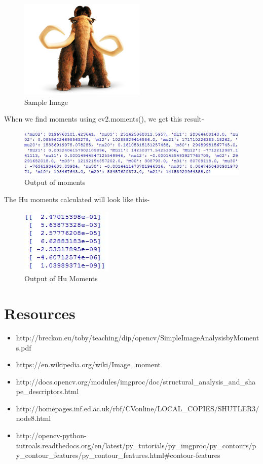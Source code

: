 \documentclass[]{article}
\providecommand{\tightlist}{%
  \setlength{\itemsep}{0pt}\setlength{\parskip}{0pt}}
\begin{document}
\begin{figure}[htbp]
\centering
\includegraphics[width=6cm]{images/Moments/example.jpg}
\caption{Sample Image}
\end{figure}

When we find moments using cv2.moments(), we get this result-

\begin{figure}[htbp]
\centering
\includegraphics{images/Moments/result moments.JPG}
\caption{Output of moments}
\end{figure}

The Hu moments calculated will look like this-

\begin{figure}[htbp]
\centering
\includegraphics{images/Moments/result hu.JPG}
\caption{Output of Hu Moments}
\end{figure}
\pagebreak
\section{Resources}\label{resources}

\begin{itemize}
\tightlist
\item
  http://breckon.eu/toby/teaching/dip/opencv/SimpleImageAnalysisbyMoments.pdf
\item
  https://en.wikipedia.org/wiki/Image\_moment
\item
  http://docs.opencv.org/modules/imgproc/doc/structural\_analysis\_and\_shape\_descriptors.html
\item
  http://homepages.inf.ed.ac.uk/rbf/CVonline/LOCAL\_COPIES/SHUTLER3/node8.html
\item
  http://opencv-python-tutroals.readthedocs.org/en/latest/py\_tutorials/py\_imgproc/py\_contours/py\_contour\_features/py\_contour\_features.html\#contour-features
\end{itemize}
\end{document}

